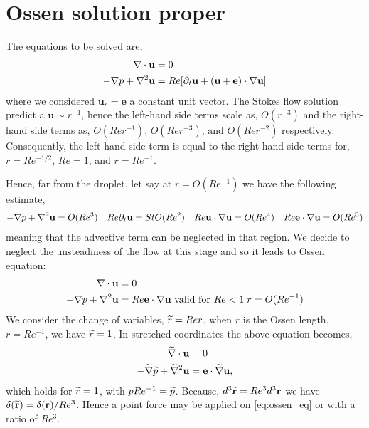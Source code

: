 






\section{Ossen solution proper}

The equations to be solved are, 
\begin{align}
    \mathbf{\nabla}\cdot \textbf{u} &= 0
    \\
    -\mathbf{\nabla} p + \mathbf{\nabla}^2 \textbf{u}
    &= 
    Re [
    \partial_t \textbf{u}
    + (\textbf{u}+ \textbf{e})\cdot \mathbf{\nabla} \textbf{u}]
\end{align}
where we considered $\textbf{u}_r = \textbf{e}$ a constant unit vector. 
The Stokes flow solution predict a $\textbf{u}\sim r^{-1}$, hence the left-hand side terms scale as, $O(r^{-3})$ and the right-hand side terms as, $O(Re r^{-1})$, $O(Re r^{-3})$, and $O(Re r^{-2})$ respectively. 
Consequently, the left-hand side term is equal to the right-hand side terms for, $r =Re^{-1/2}$, $Re = 1$, and $r = Re^{-1}$. 

Hence, far from the droplet, let say at $r = O(Re^{-1})$ we have the following estimate, 
\begin{align}
    -\mathbf{\nabla} p + \mathbf{\nabla}^2 \textbf{u} = O(Re^3) &&
    Re \partial_t \textbf{u} = St O(Re^2) && 
    Re \textbf{u}\cdot \mathbf{\nabla} \textbf{u} = O(Re^4) && 
    Re \textbf{e}\cdot \mathbf{\nabla} \textbf{u} = O(Re^3) 
\end{align}
meaning that the advective term can be neglected in that region. 
We decide to neglect the unsteadiness of the flow at this stage and so it leads to Ossen equation: 
\begin{align}
    \div \textbf{u} &= 0
    \\
    -\grad p + \grad^2 \textbf{u}
    &= 
    Re  \textbf{e} \cdot \grad \textbf{u} 
    \text{  valid for } Re < 1\;  r = O(Re^{-1})
    \label{eq:ossen_eq}
\end{align}
We consider the change of variables, $\widetilde{r} = Re r$, when $r$ is the Ossen length, $r=Re^{-1}$, we have $\widetilde{r} = 1$,
In stretched coordinates the above equation becomes, 
\begin{align}
     \wt{\grad}\cdot  \textbf{u} &= 0
    \\
    - 
    \wt{\grad} \wt{p} +  \wt{\grad}^2 \textbf{u}
    &= 
    \textbf{e} \cdot \wt{\grad} \textbf{u}, 
    \label{eq:ossen_eq_streatching}
\end{align}
which holds for $\widetilde{r} = 1$, with $p Re^{-1}= \widetilde{p}$. 
Because, $d^3\widetilde{\textbf{r}}= Re^3 d^3 \textbf{r}$ we have $ \delta(\widetilde{\textbf{r}}) = \delta(\textbf{r})/Re^3$. Hence a point force may be applied on \ref{eq:ossen_eq} or \label{eq:ossen_eq_streatching} with a ratio of $Re^3$. 

